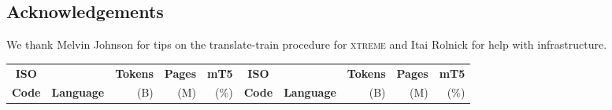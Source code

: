 \documentclass[11pt]{article}
\begin{document}
\subsection*{Acknowledgements}

We thank Melvin Johnson for tips on the translate-train procedure for \textsc{xtreme} and Itai Rolnick for help with infrastructure.




\begin{table*}[h!]
\begin{center}
\footnotesize
\begin{tabular}[b]{clrrr|clrrr}
\toprule
\textbf{ISO} & & \textbf{Tokens} & \textbf{Pages} & \textbf{mT5} & \textbf{ISO} & & \textbf{Tokens} & \textbf{Pages} & \textbf{mT5} \\
\textbf{Code} & \textbf{Language} & (B) & (M) & (\%) & \textbf{Code} & \textbf{Language} & (B) & (M) & (\%) \\
\cmidrule(r){1-5}\cmidrule(l){6-10}


\end{tabular}
\end{center}
\end{table*}
\end{document}
